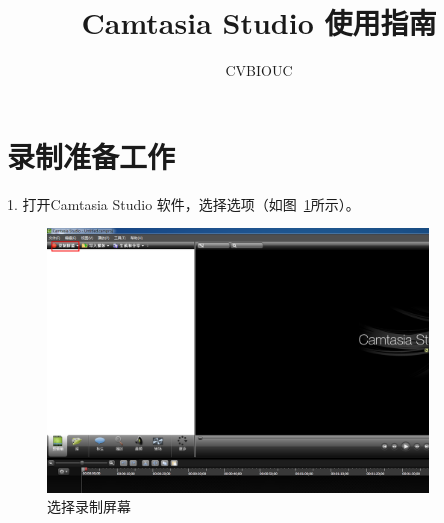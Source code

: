 \documentclass[12pt]{article}
\begin{document}
\title{Camtasia Studio 使用指南}
\author{CVBIOUC}
\maketitle\thispagestyle{fancy}
\maketitle

\section{录制准备工作}
1. 打开Camtasia Studio 软件，选择{\color{blue}{录制屏幕}}选项（如图~\ref{fig:fig1}所示）。
    \begin{figure}[!ht]
    \centering
    \includegraphics[width=0.9\textwidth]{fig1.png}
    \caption{选择录制屏幕}
    \label{fig:fig1}
    \end{figure}  
    
\end{document}
